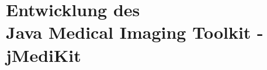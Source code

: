 \part[Entwicklung des Java Medical Imaging Toolkit]{Entwicklung des \\ Java Medical Imaging Toolkit - \\ jMediKit}